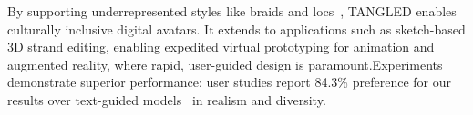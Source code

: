 By supporting underrepresented styles like braids and locs~\cite{meishvili2024hairmony}, TANGLED enables culturally inclusive digital avatars. It extends to applications such as sketch-based 3D strand editing, enabling expedited virtual prototyping for animation and augmented reality, where rapid, user-guided design is paramount.Experiments demonstrate superior performance: user studies report 84.3\% preference for our results over text-guided models~\cite{HAAR:CVPR:2024} in realism and diversity.

